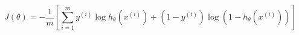 \documentclass[preview]{standalone}
\begin{document}
\centering $$J(\theta) = -\frac{1}{m} [\sum_{i=1}^{m} y^{(i)} \log{h_{\theta}(x^{(i)})} + (1-y^{(i)}) \log{(1-h_{\theta}(x^{(i)}))}] $$
\end{document}
